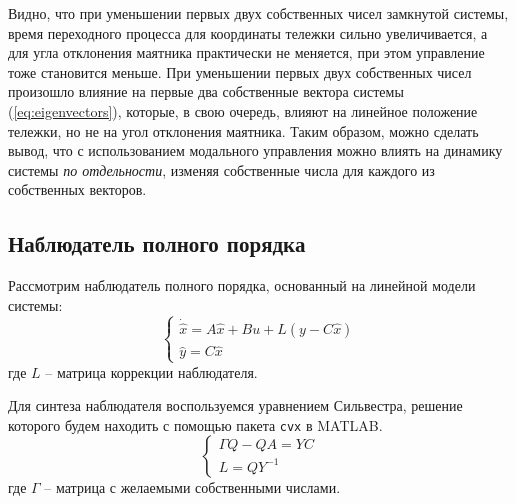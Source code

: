 \FloatBarrier
Видно, что при уменьшении первых двух собственных чисел замкнутой системы, время переходного процесса для 
координаты тележки сильно увеличивается, а для угла отклонения маятника практически не меняется, при этом 
управление тоже становится меньше. При уменьшении первых двух собственных чисел произошло влияние на первые 
два собственные вектора системы (\ref{eq:eigenvectors}), которые, в свою очередь, влияют на 
линейное положение тележки, но не на угол отклонения маятника. Таким образом, можно сделать вывод, что 
с использованием модального управления можно влиять на динамику системы \textit{по отдельности}, изменяя 
собственные числа для каждого из собственных векторов.

\subsection{Наблюдатель полного порядка}
Рассмотрим наблюдатель полного порядка, основанный на линейной модели системы: 
\begin{equation}
    \begin{cases}
        \dot{\hat{x}} = A\hat{x} + Bu + L(y - C\hat{x})\\
        \hat{y} = C\hat{x}
    \end{cases}
\end{equation}
где $L$ -- матрица коррекции наблюдателя. 

Для синтеза наблюдателя воспользуемся уравнением Сильвестра, решение которого будем находить с помощью
пакета \texttt{cvx} в MATLAB.
\begin{equation}
    \begin{cases}
        \Gamma Q - QA = YC \\ 
        L = QY^{-1}
    \end{cases}
\end{equation}
где $\Gamma$ -- матрица с желаемыми собственными числами. 

